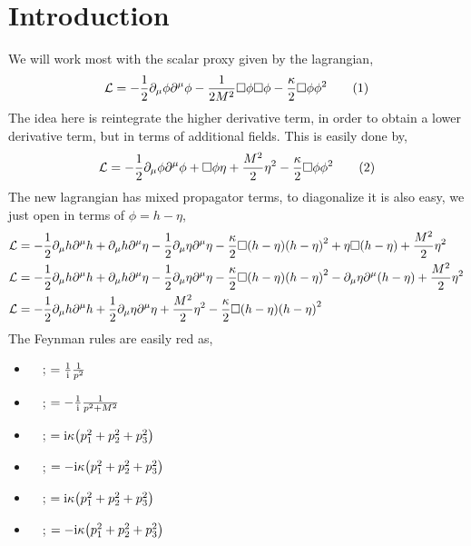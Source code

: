 \section{Introduction}

We will work most with the scalar proxy given by the lagrangian,
\[\mathcal L =-\frac12\partial_\mu \phi\partial^\mu \phi-\frac{1}{2M ^2}\Box \phi\Box\phi-\frac{\kappa}{2}\Box \phi \phi^2\numberthis\]
The idea here is reintegrate the higher derivative term, in order to obtain a lower derivative term, but in terms of additional 
fields. This is easily done by,
\[\mathcal L =-\frac12\partial_\mu \phi\partial^\mu \phi+\Box \phi\eta+\frac{M^2}{2}\eta^2-\frac{\kappa}{2}\Box \phi \phi^2\numberthis\]
The new lagrangian has mixed propagator terms, to diagonalize it is also easy, we just open in terms of $\phi=h-\eta$,
\begin{align}
    \mathcal L&=-\frac12\partial_\mu h\partial^\mu h +\partial_\mu h\partial^\mu \eta-\frac12\partial_\mu\eta\partial^\mu\eta-\frac\kappa2\Box\qty(h-\eta)\qty(h-\eta)^2+\eta\Box\qty(h-\eta)+\frac{M^2}{2}\eta^2\\
    \mathcal L&=-\frac12\partial_\mu h\partial^\mu h +\partial_\mu h\partial^\mu \eta-\frac12\partial_\mu\eta\partial^\mu\eta-\frac\kappa2\Box\qty(h-\eta)\qty(h-\eta)^2-\partial_\mu\eta\partial^\mu\qty(h-\eta)+\frac{M^2}{2}\eta^2\\
    \mathcal L&=-\frac12\partial_\mu h\partial^\mu h +\frac12\partial_\mu\eta\partial^\mu\eta+\frac{M^2}{2}\eta^2-\frac\kappa2\Box\qty(h-\eta)\qty(h-\eta)^2
\end{align}
The Feynman rules are easily red as,
\begin{itemize}
    \item \ \ ; $=\frac1{\textnormal{i}}\frac{1}{p^2}$
    \item \ \ ; $=-\frac1{\textnormal{i}}\frac{1}{p^2+M^2}$
	\item \ \ ; $=\textnormal{i}\kappa\qty(p_1^2+p_2^2+p_3^2)$
	\item \ \ ; $=-\textnormal{i}\kappa\qty(p_1^2+p_2^2+p_3^2)$
	\item \ \ ; $=\textnormal{i}\kappa\qty(p_1^2+p_2^2+p_3^2)$
	\item \ \ ; $=-\textnormal{i}\kappa\qty(p_1^2+p_2^2+p_3^2)$
\end{itemize}

